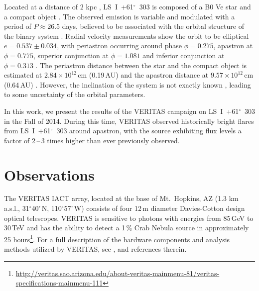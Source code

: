 \documentclass[preprint2]{aastex}
\newcommand{\tapp}{\raisebox{0.5ex}{\texttildelow}}
\newcommand{\lsi}{LS~I~+61$^{\circ}$~303}
\newcommand{\gev}{\,GeV}
\newcommand{\tev}{\,TeV}
\begin{document}
Located at a distance of \tapp{}$2$ kpc \citep{1991AJ....101.2126F}, \lsi{} is composed of a B0 Ve star and a compact object \citep{HandC1981, Casares2005}. The observed emission is variable and modulated with a period of $P \approx 26.5$ days, believed to be associated with the orbital structure of the binary system \citep{Albert2006, Esposito2007, VERITASLSIDetection, Abdo2009, LiXray, 2015A&A...575L...9M}. Radial velocity measurements show the orbit to be elliptical $e = 0.537\pm0.034$, with periastron occurring around phase $\phi=0.275$, apastron at $\phi=0.775$, superior conjunction at $\phi=1.081$ and inferior conjunction at $\phi=0.313$ \citep{Aragona2009}. The periastron distance between the star and the compact object is estimated at $2.84 \times 10^{12}$\,cm (0.19\,AU) and the apastron distance at $9.57 \times 10^{12}$\,cm (0.64\,AU) \citep{2013A&ARv..21...64D}. However, the inclination of the system is not exactly known \citep[it is expected to lie in the range $10^\circ$\,--\,$60^\circ$ according to][]{2013A&ARv..21...64D}, leading to some uncertainty of the orbital parameters.


In this work, we present the results of the VERITAS campaign on \lsi{} in the Fall of 2014. During this time, VERITAS observed historically bright flares from \lsi{} around apastron, with the source exhibiting flux levels a factor of 2\,--\,3 times higher than ever previously observed.

\section{Observations}
The VERITAS IACT array, located at the base of Mt.\ Hopkins, AZ (1.3 km a.s.l., 31$^{\circ}$40'\,N, 110$^{\circ}$57'\,W) consists of four 12\,m diameter Davies-Cotton design optical telescopes. VERITAS is sensitive to photons with energies from 85\gev{} to 30\tev{} and has the ability to detect a 1\,\% Crab Nebula source in approximately 25 hours\footnote{\url{http://veritas.sao.arizona.edu/about-veritas-mainmenu-81/veritas-specifications-mainmenu-111}}. For a full description of the hardware components and analysis methods utilized by VERITAS, see \citet{VERITAS, KiedaVTSUpgrade, VERITASLSIDetection}, and references therein.
\end{document}
